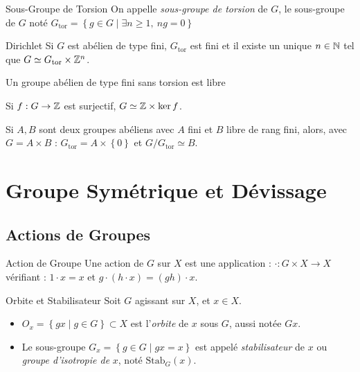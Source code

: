 \documentclass{cours}
\begin{document}
\begin{définition}{Sous-Groupe de Torsion}{}
    On appelle \emph{sous-groupe de torsion} de $G$, le sous-groupe de $G$ noté $G_{\text{tor}} =\left\{g \in G \mid \exists n \geq 1, \ ng = 0\right\}$
\end{définition}

\begin{théorème}{Dirichlet}{}
    Si $G$ est abélien de type fini, $G_{\text{tor}}$ est fini et il existe un unique $n \in \mathbb{N}$ tel que $G \simeq G_{\text{tor}} \times \mathbb{Z}^{n}$.
\end{théorème}

\begin{corollaire}{}{}
    Un groupe abélien de type fini sans torsion est libre
\end{corollaire}

\begin{lemma}
    Si $f:  G \rightarrow \mathbb{Z}$ est surjectif, $G \simeq \mathbb{Z} \times \ker f$.
\end{lemma}

\begin{lemma}
    Si $A, B$ sont deux groupes abéliens avec $A$ fini et $B$ libre de rang fini, alors, avec $G = A\times B$ : $G_{\text{tor}} = A \times \left\{0\right\}$ et $G/G_{\text{tor}} \simeq B$.
\end{lemma}

\newpage
\section{Groupe Symétrique et Dévissage}
\subsection{Actions de Groupes}
\begin{définition}{Action de Groupe}{}
    Une action de $G$ sur $X$ est une application :
    $\cdot : G \times X \rightarrow X$ vérifiant :
    $ 1\cdot x = x$ et $g \cdot \left(h \cdot x\right) = (gh) \cdot x$.
\end{définition}

\begin{définition}{Orbite et Stabilisateur}{}
    Soit $G$ agissant sur $X$, et $x \in X$.
    \begin{itemize}
        \item $O_{x} = \left\{gx \mid g \in G\right\} \subset X$ est l'\emph{orbite} de $x$ sous $G$, aussi notée $Gx$.
        \item Le sous-groupe $G_{x} = \left\{g \in G \mid gx = x\right\}$ est appelé \emph{stabilisateur} de $x$ ou \emph{groupe d'isotropie de} $x$, noté $\text{Stab}_{G}(x)$.
    \end{itemize}
\end{définition}
\end{document}

